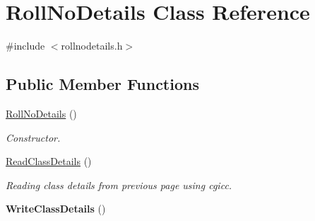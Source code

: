\hypertarget{classRollNoDetails}{\section{Roll\-No\-Details Class Reference}
\label{classRollNoDetails}
}


{\ttfamily \#include $<$rollnodetails.\-h$>$}

\subsection*{Public Member Functions}
\begin{DoxyCompactItemize}
\item 
\hyperlink{classRollNoDetails_aef927fa87d8ab659f6a241290936980c}{Roll\-No\-Details} ()
\begin{DoxyCompactList}\small\item\em Constructor. \end{DoxyCompactList}\item 
\hyperlink{classRollNoDetails_a218c683c86ee19788b868a08af6e210f}{Read\-Class\-Details} ()
\begin{DoxyCompactList}\small\item\em Reading class details from previous page using cgicc. \end{DoxyCompactList}\item 
\hypertarget{classRollNoDetails_ade931d9c426fbd3fd5d8db72b3a55289}{{\bfseries Write\-Class\-Details} ()}\label{classRollNoDetails_ade931d9c426fbd3fd5d8db72b3a55289}

\end{DoxyCompactItemize}
